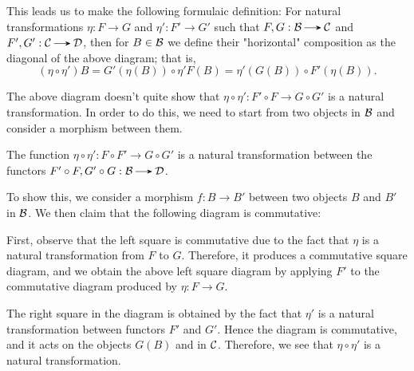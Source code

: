     This leads us to make the following formulaic definition:
    For natural transformations $\eta: F \to G$ and $\eta': F' \to
    G'$ such that $F, G: \bb \to \cc$ and $F',G' : \cc \to \dd$, then
    for $B \in \mathcal{B}$ we define their "horizontal" composition as the
    diagonal of the above diagram; that is,
    \[
        (\eta \circ \eta')B = G'(\eta(B)) \circ \eta' F(B) = \eta'(G(B))\circ F'(\eta(B)).
    \]

    The above diagram doesn't quite show that $\eta \circ \eta': F'
    \circ F
    \to G \circ G' $ is a natural transformation. In order to do this, we
    need to start from two objects in $\mathcal{B}$ and consider a morphism
    between them. 

    \begin{proposition}
        The function $\eta \circ \eta':F\circ F'  \to G \circ G'$ is a natural
        transformation between the functors $F'\circ F, G' \circ G:
        \bb \to \dd$. 
    \end{proposition}

    \begin{prf}
        To show this, we consider a morphism $f: B \to B'$ between two
        objects $B$ and $B'$ in $\mathcal{B}$. We then claim that the
        following diagram is commutative:
        \begin{center}
            \hspace{1cm}
        \end{center}
        First, observe that the left square is commutative due to the
        fact that $\eta$ is a natural transformation from $F$ to $G$.
        Therefore, it produces a commutative square diagram, and we obtain
        the above left square diagram by applying $F'$ to the
        commutative diagram produced by $\eta: F \to G$.

        The right square in the diagram is obtained by the fact that
        $\eta'$ is a natural transformation between functors $F'$ and
        $G'$. Hence the diagram is commutative, and it acts on the
        objects $G(B)$ and in $\mathcal{C}$. Therefore, we see that $\eta \circ
        \eta'$ is a natural transformation. 
    \end{prf}

